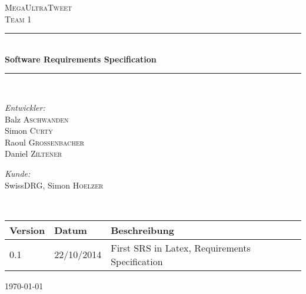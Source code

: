 \begin{titlepage}
\begin{center}



\textsc{\LARGE MegaUltraTweet}\\[1.0cm]
\textsc{\Large Team 1}\\[1.5cm]
\newcommand{\HRule}{\rule{\linewidth}{0.5mm}}
\HRule \\[0.4cm]
{ \huge \bfseries Software Requirements Specification}\\[0.4cm]

\HRule \\[1.5cm]

\begin{minipage}{0.4\textwidth}
\begin{flushleft} \large
\emph{Entwickler:}\\
Balz \textsc{Aschwanden}\\
Simon \textsc{Curty}\\
Raoul \textsc{Grossenbacher}\\
Daniel \textsc{Ziltener}
\end{flushleft}
\end{minipage}
\hfill
\begin{minipage}{0.4\textwidth}
\begin{flushright} \large
\emph{Kunde:} \\
SwissDRG, Simon \textsc{Hoelzer}
\end{flushright}
\end{minipage}
\\[1.5cm]
\begin{tabular}{|l|l|l|}
\hline
\textbf{Version}&\textbf{Datum}&\textbf{Beschreibung}\\ \hline
0.1 & 22/10/2014 & First SRS in Latex, Requirements Specification \\ \hline
\end{tabular}

\vfill

{\large \today}

\end{center}

\end{titlepage}
